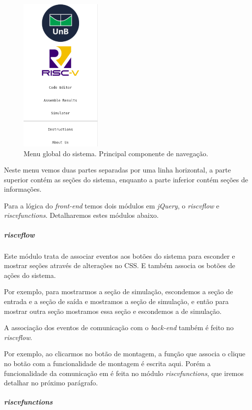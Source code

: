 			\begin{figure}[h!]
			  \centering
			  \includegraphics[width=4cm]{img/menu_global.png}
			  \caption{Menu global do sistema. Principal componente de navegação.}
			  \label{fig:menu_global}
			\end{figure}

			Neste menu vemos duas partes separadas por uma linha horizontal, a parte superior contém as seções do sistema, enquanto a parte inferior contém seções de informações.

			Para a lógica do \textit{front-end} temos dois módulos em \textit{jQuery}, o \textit{riscv\textunderscore flow} e \textit{riscv\textunderscore functions}. Detalharemos estes módulos abaixo.

			\subparagraph{riscv\textunderscore flow}

				Este módulo trata de associar eventos aos botões do sistema para esconder e mostrar seções através de alterações no CSS. E também associa os botões de ações do sistema.

				Por exemplo, para mostrarmos a seção de simulação, escondemos a seção de entrada e a seção de saída e mostramos a seção de simulação, e então para mostrar outra seção mostramos essa seção e escondemos a de simulação.

				A associação dos eventos de comunicação com o \textit{back-end} também é feito no \textit{riscv\textunderscore flow}.

				Por exemplo, ao clicarmos no botão de montagem, a função que associa o clique no botão com a funcionalidade de montagem é escrita aqui. Porém a funcionalidade da comunicação em é feita no módulo \textit{riscv\textunderscore functions}, que iremos detalhar no próximo parágrafo.  

			\subparagraph{riscv\textunderscore functions}

